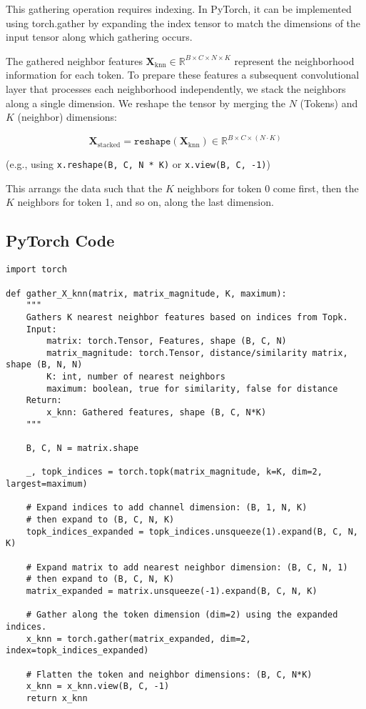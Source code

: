 \documentclass{article}
\begin{document}
This gathering operation requires indexing. In PyTorch, it can be implemented using torch.gather by expanding the index tensor to match the dimensions of the input tensor along which gathering occurs. 

The gathered neighbor features \(\mathbf{X}_{\text{knn}} \in \mathbb{R}^{B \times C \times N \times K}\) represent the neighborhood information for each token. To prepare these features a subsequent convolutional layer that processes each neighborhood independently, we stack the neighbors along a single dimension. We reshape the tensor by merging the \(N\) (Tokens) and \(K\) (neighbor) dimensions: 

\[
    \mathbf{X}_{\text{stacked}} = \texttt{reshape}(\mathbf{X}_{\text{knn}}) \in \mathbb{R}^{B \times C \times (N \cdot K)}
\]

(e.g., using \texttt{x.reshape(B, C, N * K)} or \texttt{x.view(B, C, -1)})

This arrangs the data such that the \(K\) neighbors for token 0 come first, then the \(K\) neighbors for token 1, and so on, along the last dimension. 


\subsection*{PyTorch Code}

\begin{verbatim}
import torch 

def gather_X_knn(matrix, matrix_magnitude, K, maximum):
    """ 
    Gathers K nearest neighbor features based on indices from Topk. 
    Input: 
        matrix: torch.Tensor, Features, shape (B, C, N)
        matrix_magnitude: torch.Tensor, distance/similarity matrix, shape (B, N, N)
        K: int, number of nearest neighbors 
        maximum: boolean, true for similarity, false for distance
    Return: 
        x_knn: Gathered features, shape (B, C, N*K)
    """

    B, C, N = matrix.shape 

    _, topk_indices = torch.topk(matrix_magnitude, k=K, dim=2, largest=maximum)

    # Expand indices to add channel dimension: (B, 1, N, K) 
    # then expand to (B, C, N, K)
    topk_indices_expanded = topk_indices.unsqueeze(1).expand(B, C, N, K)

    # Expand matrix to add nearest neighbor dimension: (B, C, N, 1) 
    # then expand to (B, C, N, K)
    matrix_expanded = matrix.unsqueeze(-1).expand(B, C, N, K)

    # Gather along the token dimension (dim=2) using the expanded indices. 
    x_knn = torch.gather(matrix_expanded, dim=2, index=topk_indices_expanded)

    # Flatten the token and neighbor dimensions: (B, C, N*K)
    x_knn = x_knn.view(B, C, -1)
    return x_knn
\end{verbatim}
\end{document}
